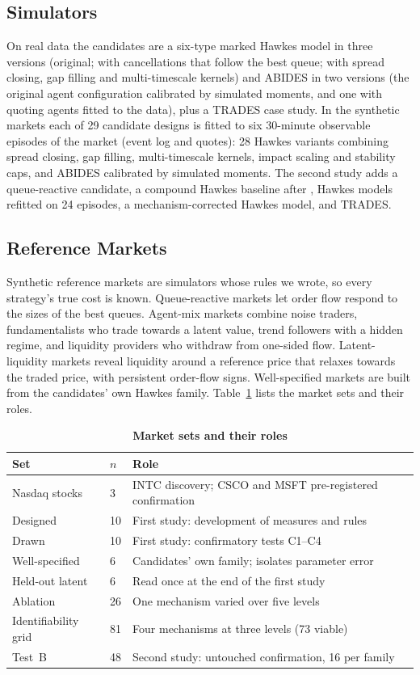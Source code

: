 \documentclass{ieeeaccess}
\begin{document}
\subsection{Simulators}
On real data the candidates are a six-type marked Hawkes model in three versions (original; with cancellations that
follow the best queue; with spread closing, gap filling and multi-timescale kernels) and ABIDES in two versions (the
original agent configuration calibrated by simulated moments, and one with quoting agents fitted to the data), plus a
TRADES case study. In the synthetic markets each of 29 candidate designs is fitted to six 30-minute observable episodes
of the market (event log and quotes): 28 Hawkes variants combining spread closing, gap filling, multi-timescale kernels,
impact scaling and stability caps, and ABIDES calibrated by simulated moments. The second study adds a queue-reactive
candidate, a compound Hawkes baseline after \cite{jain2024compound}, Hawkes models refitted on 24 episodes, a
mechanism-corrected Hawkes model, and TRADES.

\subsection{Reference Markets}
Synthetic reference markets are simulators whose rules we wrote, so every strategy's true cost is known. Queue-reactive
markets let order flow respond to the sizes of the best queues. Agent-mix markets combine noise traders, fundamentalists
who trade towards a latent value, trend followers with a hidden regime, and liquidity providers who withdraw from
one-sided flow. Latent-liquidity markets reveal liquidity around a reference price that relaxes towards the traded price,
with persistent order-flow signs. Well-specified markets are built from the candidates' own Hawkes family.
Table~\ref{tab:sets} lists the market sets and their roles.

\begin{table}
\caption{\textbf{Market sets and their roles}}
\label{tab:sets}
\setlength{\tabcolsep}{3pt}
\begin{tabular}{|p{62pt}|p{20pt}|p{140pt}|}
\hline
Set & $n$ & Role \\
\hline
Nasdaq stocks & 3 & INTC discovery; CSCO and MSFT pre-registered confirmation \\
Designed & 10 & First study: development of measures and rules \\
Drawn & 10 & First study: confirmatory tests C1--C4 \\
Well-specified & 6 & Candidates' own family; isolates parameter error \\
Held-out latent & 6 & Read once at the end of the first study \\
Ablation & 26 & One mechanism varied over five levels \\
Identifiability grid & 81 & Four mechanisms at three levels (73 viable) \\
Test~B & 48 & Second study: untouched confirmation, 16 per family \\
\hline
\end{tabular}
\end{table}
\end{document}
